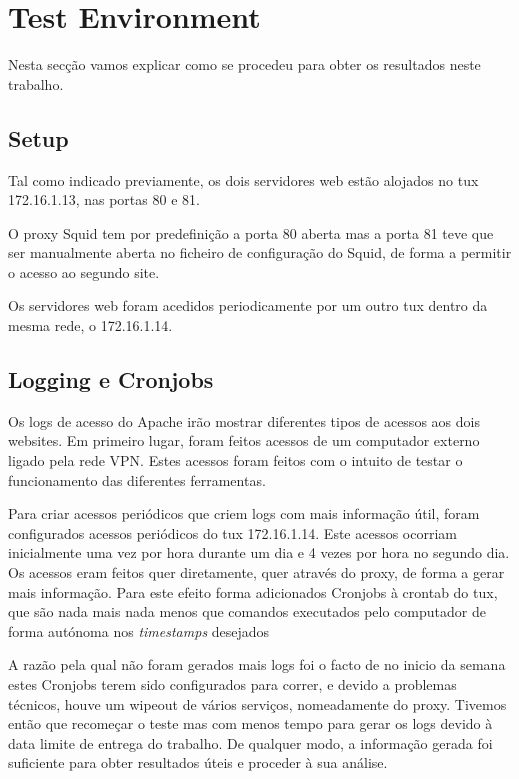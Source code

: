 \chapter{Test Environment} \label{test}
Nesta secção vamos explicar como se procedeu para obter os resultados neste trabalho.

\section{Setup}
Tal como indicado previamente, os dois servidores web estão alojados no tux 172.16.1.13, nas portas 80 e 81.

O proxy Squid tem por predefinição a porta 80 aberta mas a porta 81 teve que ser manualmente aberta no ficheiro de configuração do Squid,
de forma a permitir o acesso ao segundo site.

Os servidores web foram acedidos periodicamente por um outro tux dentro da mesma rede, o 172.16.1.14.

\section{Logging e Cronjobs}
Os logs de acesso do Apache irão mostrar diferentes tipos de acessos aos dois websites.
Em primeiro lugar, foram feitos acessos de um computador externo ligado pela rede VPN. Estes acessos foram feitos com o intuito
de testar o funcionamento das diferentes ferramentas.

Para criar acessos periódicos que criem logs com mais informação útil, foram configurados acessos periódicos do tux 172.16.1.14.
Este acessos ocorriam inicialmente uma vez por hora durante um dia e 4 vezes por hora no segundo dia.
Os acessos eram feitos quer diretamente, quer através do proxy, de forma a gerar mais informação.
Para este efeito forma adicionados Cronjobs à crontab do tux, que são nada mais nada menos que comandos executados pelo computador
de forma autónoma nos \textit{timestamps} desejados

A razão pela qual não foram gerados mais logs foi o facto de no inicio da semana estes Cronjobs terem sido configurados para correr, 
e devido a problemas técnicos, houve um wipeout de vários serviços, nomeadamente do proxy. Tivemos então que recomeçar o teste mas com
menos tempo para gerar os logs devido à data limite de entrega do trabalho. De qualquer modo, a informação gerada foi suficiente
para obter resultados úteis e proceder à sua análise.
